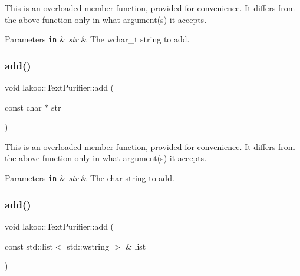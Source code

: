 This is an overloaded member function, provided for convenience. It differs from the above function only in what argument(s) it accepts. 
\begin{DoxyParams}[1]{Parameters}
\mbox{\tt in}  & {\em str} & The wchar\+\_\+t string to add. \\
\hline
\end{DoxyParams}
\mbox{\label{classlakoo_1_1_text_purifier_ad035c47d9d3ab94a38aeb46602ae2cc4}} 
\subsubsection{\texorpdfstring{add()}{add()}\hspace{0.1cm}{\footnotesize\ttfamily [4/8]}}
{\footnotesize\ttfamily void lakoo\+::\+Text\+Purifier\+::add (\begin{DoxyParamCaption}\item[{const char $\ast$}]{str }\end{DoxyParamCaption})}

This is an overloaded member function, provided for convenience. It differs from the above function only in what argument(s) it accepts. 
\begin{DoxyParams}[1]{Parameters}
\mbox{\tt in}  & {\em str} & The char string to add. \\
\hline
\end{DoxyParams}
\mbox{\label{classlakoo_1_1_text_purifier_a2f8d0c108599b5731424d5bfef6e4c00}} 
\subsubsection{\texorpdfstring{add()}{add()}\hspace{0.1cm}{\footnotesize\ttfamily [5/8]}}
{\footnotesize\ttfamily void lakoo\+::\+Text\+Purifier\+::add (\begin{DoxyParamCaption}\item[{const std\+::list$<$ std\+::wstring $>$ \&}]{list }\end{DoxyParamCaption})}



